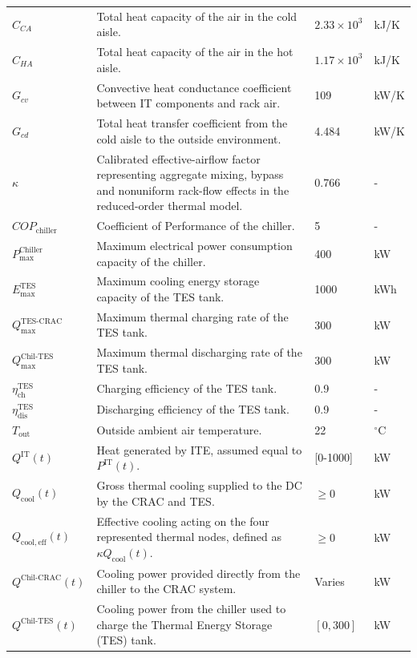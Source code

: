 \documentclass[lettersize,journal]{IEEEtran}
\begin{document}
{{\begin{longtable}{p{} p{} p{} p{}}
$C_{CA}$ & Total heat capacity of the air in the cold aisle. & $2.33 \times 10^3$ & kJ/K \\
$C_{HA}$ & Total heat capacity of the air in the hot aisle. & $1.17 \times 10^3$ & kJ/K \\
$G_{cv}$ & Convective heat conductance coefficient between IT components and rack air. & 109 &kW/K \\
$G_{cd}$ & Total heat transfer coefficient from the cold aisle to the outside environment. & 4.484 &kW/K \\
$\kappa$ & Calibrated effective-airflow factor representing aggregate mixing, bypass and nonuniform rack-flow effects in the reduced-order thermal model. & 0.766 & - \\
$COP_{\mathrm{chiller}}$ & Coefficient of Performance of the chiller. & 5 & - \\
$P^{\mathrm{Chiller}}_{\mathrm{max}}$ & Maximum electrical power consumption capacity of the chiller. & 400 &kW \\
$E^{\mathrm{TES}}_{\mathrm{max}}$ & Maximum cooling energy storage capacity of the TES tank. & 1000 &kWh \\
$Q^{\mathrm{TES}\text{-}\mathrm{CRAC}}_{\mathrm{max}}$ & Maximum thermal charging rate of the TES tank. & 300 &kW \\
$Q^{\mathrm{Chil}\text{-}\mathrm{TES}}_{\mathrm{max}}$ & Maximum thermal discharging rate of the TES tank. & 300 &kW \\
$\eta^{\mathrm{TES}}_{\mathrm{ch}}$ & Charging efficiency of the TES tank. & 0.9 & - \\
$\eta^{\mathrm{TES}}_{\mathrm{dis}}$ & Discharging efficiency of the TES tank. & 0.9 & - \\
$T_{\mathrm{out}}$ & Outside ambient air temperature. & 22 & $^{\circ}$C \\
$Q^{\mathrm{IT}}(t)$ & Heat generated by ITE, assumed equal to $P^{\mathrm{IT}}(t)$. & [0-1000] &kW \\
$Q_{\mathrm{cool}}(t)$ & Gross thermal cooling supplied to the DC by the CRAC and TES. & $\geq 0$ &kW \\
$Q_{\mathrm{cool,eff}}(t)$ & Effective cooling acting on the four represented thermal nodes, defined as $\kappa Q_{\mathrm{cool}}(t)$. & $\geq 0$ &kW \\
$Q^{\mathrm{Chil}\text{-}\mathrm{CRAC}}(t)$ & Cooling power provided directly from the chiller to the CRAC system. & Varies &kW \\
$Q^{\mathrm{Chil}\text{-}\mathrm{TES}}(t)$ & Cooling power from the chiller used to charge the Thermal Energy Storage (TES) tank. & $[0, 300]$ &kW \\

\end{longtable}}}
\end{document}
